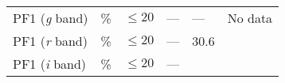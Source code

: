\documentclass[DM,toc]{lsstdoc}
\begin{document}
\begin{longtable}[]{@{}llllll@{}}
\begin{minipage}[t]{0.14\columnwidth}
PF1 (\emph{g} band)\strut
\end{minipage} & \begin{minipage}[t]{0.06\columnwidth}\raggedright\strut
\%\strut
\end{minipage} & \begin{minipage}[t]{0.17\columnwidth}\raggedright\strut
\(\leq 20\)\strut
\end{minipage} & \begin{minipage}[t]{0.17\columnwidth}\raggedright\strut
---\strut
\end{minipage} & \begin{minipage}[t]{0.12\columnwidth}\raggedright\strut
---\strut
\end{minipage} & \begin{minipage}[t]{0.17\columnwidth}\raggedright\strut
No data\strut
\end{minipage}\tabularnewline
\begin{minipage}[t]{0.14\columnwidth}\raggedright\strut
PF1 (\emph{r} band)\strut
\end{minipage} & \begin{minipage}[t]{0.06\columnwidth}\raggedright\strut
\%\strut
\end{minipage} & \begin{minipage}[t]{0.17\columnwidth}\raggedright\strut
\(\leq 20\)\strut
\end{minipage} & \begin{minipage}[t]{0.17\columnwidth}\raggedright\strut
---\strut
\end{minipage} & \begin{minipage}[t]{0.12\columnwidth}\raggedright\strut
30.6\strut
\end{minipage} & \begin{minipage}[t]{0.17\columnwidth}\raggedright\strut
\strut
\end{minipage}\tabularnewline
\begin{minipage}[t]{0.14\columnwidth}\raggedright\strut
PF1 (\emph{i} band)\strut
\end{minipage} & \begin{minipage}[t]{0.06\columnwidth}\raggedright\strut
\%\strut
\end{minipage} & \begin{minipage}[t]{0.17\columnwidth}\raggedright\strut
\(\leq 20\)\strut
\end{minipage} & \begin{minipage}[t]{0.17\columnwidth}\raggedright\strut
---\strut
\end{minipage} & \begin{minipage}[t]{0.12\columnwidth}\raggedright\strut

\end{minipage}
\end{longtable}
\end{document}

